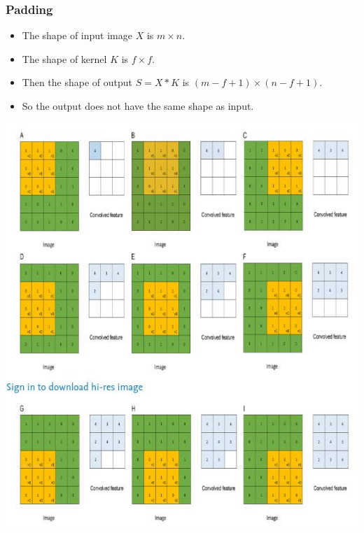 \documentclass[12pt,aspectratio=169]{beamer}
\begin{document}
\begin{frame}
\frametitle{Padding}
\begin{itemize}
\item The shape of input image $X$ is $m\times n$.
\bigskip
\item The shape of kernel $K$ is $f\times f$.
\bigskip
\item Then the shape of output $S=X*K$ is $(m-f+1)\times (n-f+1)$.
\bigskip
\item So the output does not have the same shape as input.
\end{itemize}
\end{frame}

\begin{frame}
\begin{center}
\includegraphics[scale=0.5]{padding2}
\end{center}
\end{frame}
\end{document}
